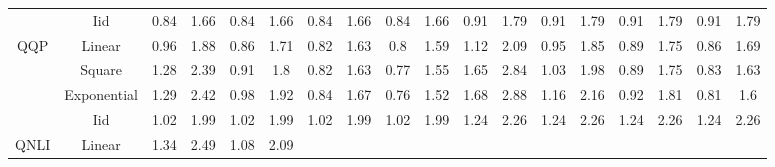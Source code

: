 \begin{table*}[t]
{\begin{tabular}{|c|c|cccccccc|cccccccc|}
 &
  Iid &
  \multicolumn{1}{c|}{0.84} &
  \multicolumn{1}{c|}{1.66} &
  \multicolumn{1}{c|}{0.84} &
  \multicolumn{1}{c|}{1.66} &
  \multicolumn{1}{c|}{0.84} &
  \multicolumn{1}{c|}{1.66} &
  \multicolumn{1}{c|}{0.84} &
  1.66 &
  \multicolumn{1}{c|}{0.91} &
  \multicolumn{1}{c|}{1.79} &
  \multicolumn{1}{c|}{0.91} &
  \multicolumn{1}{c|}{1.79} &
  \multicolumn{1}{c|}{0.91} &
  \multicolumn{1}{c|}{1.79} &
  \multicolumn{1}{c|}{0.91} &
  1.79 \\
QQP &
  Linear &
  \multicolumn{1}{c|}{0.96} &
  \multicolumn{1}{c|}{1.88} &
  \multicolumn{1}{c|}{0.86} &
  \multicolumn{1}{c|}{1.71} &
  \multicolumn{1}{c|}{0.82} &
  \multicolumn{1}{c|}{1.63} &
  \multicolumn{1}{c|}{0.8} &
  1.59 &
  \multicolumn{1}{c|}{1.12} &
  \multicolumn{1}{c|}{2.09} &
  \multicolumn{1}{c|}{0.95} &
  \multicolumn{1}{c|}{1.85} &
  \multicolumn{1}{c|}{0.89} &
  \multicolumn{1}{c|}{1.75} &
  \multicolumn{1}{c|}{0.86} &
  1.69 \\
 &
  Square &
  \multicolumn{1}{c|}{1.28} &
  \multicolumn{1}{c|}{2.39} &
  \multicolumn{1}{c|}{0.91} &
  \multicolumn{1}{c|}{1.8} &
  \multicolumn{1}{c|}{0.82} &
  \multicolumn{1}{c|}{1.63} &
  \multicolumn{1}{c|}{0.77} &
  1.55 &
  \multicolumn{1}{c|}{1.65} &
  \multicolumn{1}{c|}{2.84} &
  \multicolumn{1}{c|}{1.03} &
  \multicolumn{1}{c|}{1.98} &
  \multicolumn{1}{c|}{0.89} &
  \multicolumn{1}{c|}{1.75} &
  \multicolumn{1}{c|}{0.83} &
  1.63 \\
 &
  Exponential &
  \multicolumn{1}{c|}{1.29} &
  \multicolumn{1}{c|}{2.42} &
  \multicolumn{1}{c|}{0.98} &
  \multicolumn{1}{c|}{1.92} &
  \multicolumn{1}{c|}{0.84} &
  \multicolumn{1}{c|}{1.67} &
  \multicolumn{1}{c|}{0.76} &
  1.52 &
  \multicolumn{1}{c|}{1.68} &
  \multicolumn{1}{c|}{2.88} &
  \multicolumn{1}{c|}{1.16} &
  \multicolumn{1}{c|}{2.16} &
  \multicolumn{1}{c|}{0.92} &
  \multicolumn{1}{c|}{1.81} &
  \multicolumn{1}{c|}{0.81} &
  1.6 \\ \hline
 &
  Iid &
  \multicolumn{1}{c|}{1.02} &
  \multicolumn{1}{c|}{1.99} &
  \multicolumn{1}{c|}{1.02} &
  \multicolumn{1}{c|}{1.99} &
  \multicolumn{1}{c|}{1.02} &
  \multicolumn{1}{c|}{1.99} &
  \multicolumn{1}{c|}{1.02} &
  1.99 &
  \multicolumn{1}{c|}{1.24} &
  \multicolumn{1}{c|}{2.26} &
  \multicolumn{1}{c|}{1.24} &
  \multicolumn{1}{c|}{2.26} &
  \multicolumn{1}{c|}{1.24} &
  \multicolumn{1}{c|}{2.26} &
  \multicolumn{1}{c|}{1.24} &
  2.26 \\
\multirow{2}{*}{QNLI} &
  Linear &
  \multicolumn{1}{c|}{1.34} &
  \multicolumn{1}{c|}{2.49} &
  \multicolumn{1}{c|}{1.08} &
  \multicolumn{1}{c|}{2.09} &

\end{tabular}}
\end{table*}
